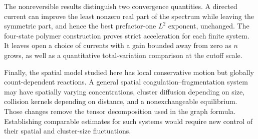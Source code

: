 The nonreversible results distinguish two convergence quantities.
A directed current can improve the least nonzero real part of the
spectrum while leaving the symmetric part, and hence the best
prefactor-one $L^2$ exponent, unchanged. The four-state polymer
construction proves strict acceleration for each finite system.
It leaves open a choice of currents with a gain bounded away from
zero as $n$ grows, as well as a quantitative total-variation
comparison at the cutoff scale.

Finally, the spatial model studied here has local conservative
motion but globally count-dependent reactions. A general spatial
coagulation--fragmentation system may have spatially varying
concentrations, cluster diffusion depending on size, collision
kernels depending on distance, and a nonexchangeable equilibrium.
Those changes remove the tensor decomposition used in the graph
formula. Establishing comparable estimates for such systems would
require new control of their spatial and cluster-size fluctuations.
